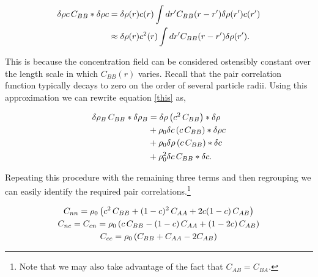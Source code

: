 \begin{align}
  \delta \rho c \, C_{BB} \ast \delta \rho c &= \delta \rho(r) c(r) \int dr^\prime C_{BB}(r - r^\prime) \delta \rho(r^\prime) c(r^\prime) \nonumber \\
                                     &\approx \delta \rho(r) c^2(r) \int dr^\prime C_{BB}(r - r^\prime) \delta \rho(r^\prime).
\end{align}

This is because the concentration field can be considered ostensibly constant over the length scale in which $C_{BB}(r)$ varies. Recall that the pair correlation function typically decays to zero on the order of several particle radii. Using this approximation we can rewrite equation \ref{this} as,

\begin{align}
  \delta \rho_B \, C_{BB} \ast \delta \rho_B &= \delta \rho \left(c^2 \,C_{BB}\right) \ast \delta \rho \nonumber\\
                             &+ \rho_0 \delta c \left(c \,C_{BB}\right) \ast \delta \rho c \\
                             &+ \rho_0 \delta \rho \left(c \,C_{BB}\right) \ast \delta c \nonumber\\
                             &+ \rho_0^2 \delta c \,C_{BB} \ast \delta c. \nonumber
\end{align}

Repeating this procedure with the remaining three terms and then regrouping we can easily identify the required pair correlations.\footnote{Note that we may also take advantage of the fact that $C_{AB} = C_{BA}$.}

\begin{gather}
  C_{nn} = \rho_0 \left( c^2 \, C_{BB} + (1 - c)^2 \, C_{AA} + 2c(1-c)\,C_{AB}\right) \\
  C_{nc} = C_{cn} = \rho_0 \left( c\,C_{BB} - (1-c)\,C_{AA} + (1 - 2c) \, C_{AB} \right) \\
  C_{cc} = \rho_0 \left( C_{BB} + C_{AA} - 2 C_{AB} \right)
\end{gather}













